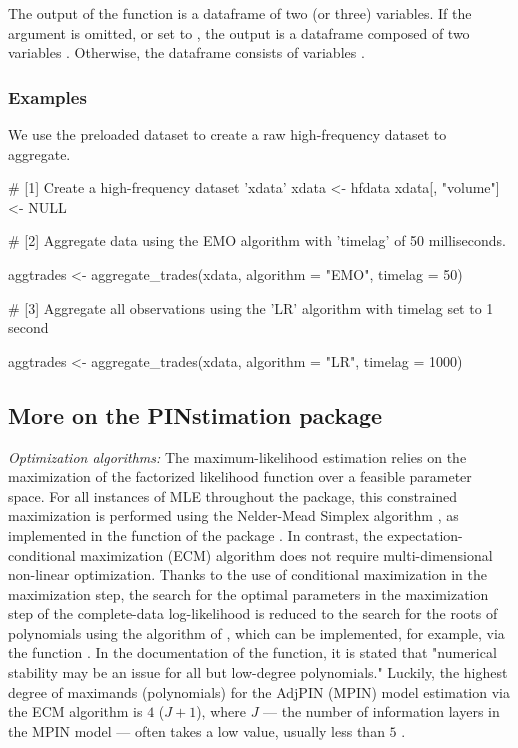 The output of the function  is a dataframe of two (or three) variables. If the argument  is omitted, or set to , the output is a dataframe composed of two variables . Otherwise, the dataframe consists of  variables . 

\subsubsection{Examples}

We use the preloaded dataset  to create a raw high-frequency dataset to aggregate.

\begin{example}
# [1] Create a high-frequency dataset 'xdata'
xdata <- hfdata
xdata[, "volume"] <- NULL

# [2] Aggregate data using the EMO algorithm with 'timelag' of 50 milliseconds.

aggtrades <- aggregate_trades(xdata, algorithm = "EMO", timelag = 50)
\end{example}

\begin{example}
# [3] Aggregate all observations using the 'LR' algorithm with timelag set to 1 second

aggtrades <- aggregate_trades(xdata, algorithm = "LR", timelag = 1000)
\end{example}

\subsection{More on the PINstimation package}

\noindent \textit{Optimization algorithms:} 
The maximum-likelihood estimation relies on the maximization of the factorized likelihood function over a feasible parameter space. For all instances of MLE throughout the package, this constrained maximization is performed using the Nelder-Mead Simplex algorithm \citep{nelder1965simplex}, as implemented in the function  of the package  \citep{nloptr}.  In contrast, the expectation-conditional maximization (ECM) algorithm does not require multi-dimensional non-linear optimization. Thanks to the use of conditional maximization in the maximization step, the search for the optimal parameters in the maximization step of the complete-data log-likelihood is reduced to the search for the roots of polynomials using the algorithm of \cite{jenkins1972algorithm}, which can be implemented, for example, via the function . In the documentation of the function, it is stated that "numerical stability may be an issue for all but low-degree polynomials." Luckily, the highest degree of  maximands (polynomials) for the AdjPIN (MPIN) model estimation via the ECM algorithm is $4$ ($J+1$), where $J$ --- the number of information layers in the MPIN model --- often takes a low value, usually less than $5$  \citep{ersan2016multilayer}.  

